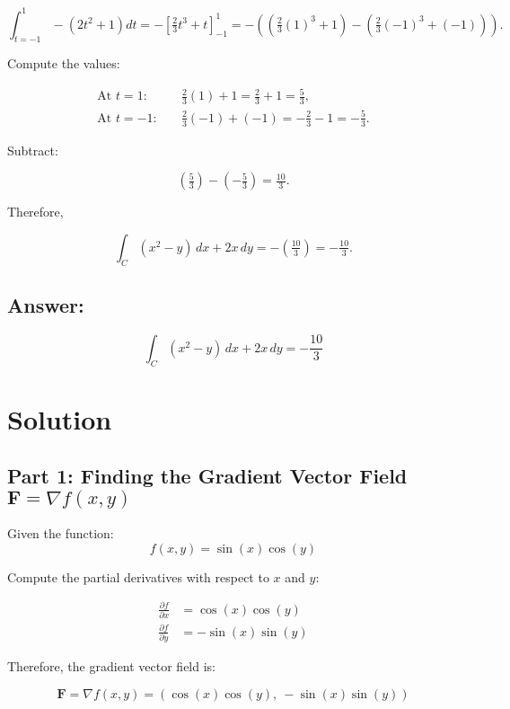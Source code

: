\documentclass[11pt]{article}
\begin{document}
\[
\int_{t=-1}^{1} -(2t^2 + 1) dt = -\left[ \tfrac{2}{3} t^3 + t \right]_{-1}^{1} = -\left( \left( \tfrac{2}{3} (1)^3 + 1 \right) - \left( \tfrac{2}{3} (-1)^3 + (-1) \right) \right).
\]

Compute the values:

\[
\begin{aligned}
\text{At } t = 1: &\quad \tfrac{2}{3} (1) + 1 = \tfrac{2}{3} + 1 = \tfrac{5}{3}, \\
\text{At } t = -1: &\quad \tfrac{2}{3} (-1) + (-1) = -\tfrac{2}{3} -1 = -\tfrac{5}{3}.
\end{aligned}
\]

Subtract:

\[
\left( \tfrac{5}{3} \right) - \left( -\tfrac{5}{3} \right) = \tfrac{10}{3}.
\]

Therefore,

\[
\int_{C} (x^2 - y) \, dx + 2x \, dy = -\left( \tfrac{10}{3} \right) = -\tfrac{10}{3}.
\]

\newpage

\subsection{Answer:}

\[
\int_{C} (x^2 - y) \, dx + 2x \, dy = -\frac{10}{3}
\]




\newpage

\section{Solution}

\subsection{Part 1: Finding the Gradient Vector Field \(\mathbf{F} = \nabla f(x, y)\)}

Given the function:
\[
f(x, y) = \sin(x) \cos(y)
\]

Compute the partial derivatives with respect to \( x \) and \( y \):

\[
\begin{aligned}
\frac{\partial f}{\partial x} &= \cos(x) \cos(y) \\
\frac{\partial f}{\partial y} &= -\sin(x) \sin(y)
\end{aligned}
\]

Therefore, the gradient vector field is:

\[
\mathbf{F} = \nabla f(x, y) = \left( \cos(x) \cos(y),\ -\sin(x) \sin(y) \right)
\]
\end{document}

